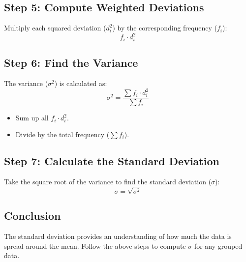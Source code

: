 \documentclass[10pt]{book}
\begin{document}
\subsection*{Step 5: Compute Weighted Deviations}
Multiply each squared deviation (\( d_i^2 \)) by the corresponding frequency (\( f_i \)):
\[
f_i \cdot d_i^2
\]

\subsection*{Step 6: Find the Variance}
The variance (\( \sigma^2 \)) is calculated as:
\[
\sigma^2 = \frac{\sum f_i \cdot d_i^2}{\sum f_i}
\]
\begin{itemize}
    \item Sum up all \( f_i \cdot d_i^2 \).
    \item Divide by the total frequency (\( \sum f_i \)).
\end{itemize}

\subsection*{Step 7: Calculate the Standard Deviation}
Take the square root of the variance to find the standard deviation (\( \sigma \)):
\[
\sigma = \sqrt{\sigma^2}
\]

\subsection*{Conclusion}
The standard deviation provides an understanding of how much the data is spread around the mean. Follow the above steps to compute \( \sigma \) for any grouped data.
\end{document}
